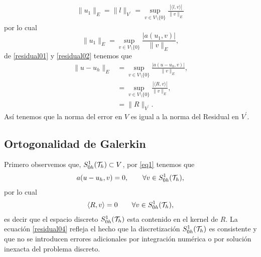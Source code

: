 \begin{equation*}
\begin{split}
\| u_{1} \|_{E}=\|l\|_{V^{\prime}}=\sup_{v\in V \setminus \{0\} } \frac{|\langle l,v \rangle|}{\|v\|_{E}}
\end{split}
\end{equation*}
por lo cual 
\begin{equation}\label{residual01}
\|u_{1}\|_{E} = \sup_{v\in V \setminus \{0\}} \frac{|a(u_{1},v)|}{\|v\|_{E}},
\end{equation}
de \eqref{residual01} y \eqref{residual02} tenemos que 
\begin{equation}\label{residual022}
\begin{split}
\|u-u_{h}\|_{E}&=\sup_{v\in V \setminus \{0\} } \frac{|a(u-u_{h},v)|}{\|v\|_{E}},\\
&=\sup_{v\in V \setminus \{0\} } \frac{|\langle R,v \rangle|}{\|v\|_{E}},\\
&=\|R\|_{V^{\prime}}.
\end{split}
\end{equation}
As\'i tenemos que la norma del error en $V$ es igual a la norma del Residual en $V^{\prime}$. 
\subsection{Ortogonalidad de Galerkin }
Primero observemos que, $S^{1}_{0h}({\mathcal{T}}_{h})\subset V$, por \eqref{eq1} tenemos que 
\begin{equation*}\label{residual03}
\begin{split}
a(u-u_{h},v)=0, \qquad \forall v\in S^{1}_{0h}({\mathcal{T}}_{h}),
\end{split}
\end{equation*}
por lo cual 
\begin{equation}\label{residual04}
\begin{split}
\langle R,v \rangle=0 \qquad \forall v\in S^{1}_{0h}({\mathcal{T}}_{h}),
\end{split}
\end{equation}
es decir que el espacio discreto  $S^{1}_{0h}({\mathcal{T}}_{h})$ esta contenido en el kernel de $R$.
La ecuaci\'on \eqref{residual04} refleja el hecho que la discretizaci\'on $S^{1}_{0h}({\mathcal{T}}_{h})$ es consistente y que no se introducen errores adicionales por integraci\'on num\'erica o por soluci\'on inexacta del problema discreto. 
